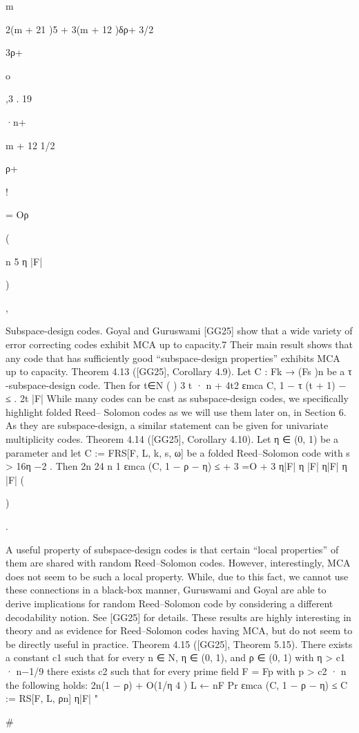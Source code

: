 \documentclass[11pt]{article}
\begin{document}
m

2(m + 21 )5 + 3(m + 12 )δρ+
3/2

3ρ+

o

,3 .
19

·n+

m + 12
1/2

ρ+

!

= Oρ

(

n
5
η |F|

)

,

Subspace-design codes. Goyal and Guruswami [GG25] show that a wide variety of error correcting codes exhibit MCA up to capacity.7 Their main result shows that any code that has sufficiently
good “subspace-design properties” exhibits MCA up to capacity.
Theorem 4.13 ([GG25], Corollary 4.9). Let C : Fk → (Fs )n be a τ -subspace-design code. Then for
t∈N
(
)
3
t · n + 4t2
εmca C, 1 − τ (t + 1) −
≤
.
2t
|F|
While many codes can be cast as subspace-design codes, we specifically highlight folded Reed–
Solomon codes as we will use them later on, in Section 6. As they are subspace-design, a similar
statement can be given for univariate multiplicity codes.
Theorem 4.14 ([GG25], Corollary 4.10). Let η ∈ (0, 1) be a parameter and let C := FRS[F, L, k, s, ω]
be a folded Reed–Solomon code with s > 16η −2 . Then
2n
24
n
1
εmca (C, 1 − ρ − η) ≤
+ 3
=O
+ 3
η|F| η |F|
η|F| η |F|
(

)

.

A useful property of subspace-design codes is that certain “local properties” of them are shared
with random Reed–Solomon codes. However, interestingly, MCA does not seem to be such a
local property. While, due to this fact, we cannot use these connections in a black-box manner,
Guruswami and Goyal are able to derive implications for random Reed–Solomon code by considering
a different decodability notion. See [GG25] for details. These results are highly interesting in theory
and as evidence for Reed–Solomon codes having MCA, but do not seem to be directly useful in
practice.
Theorem 4.15 ([GG25], Theorem 5.15). There exists a constant c1 such that for every n ∈ N,
η ∈ (0, 1), and ρ ∈ (0, 1) with η > c1 · n−1/9 there exists c2 such that for every prime field F = Fp
with p > c2 · n the following holds:
2n(1 − ρ) + O(1/η 4 )
L ← nF
Pr εmca (C, 1 − ρ − η) ≤
C := RS[F, L, ρn]
η|F|
"

 \#
\end{document}
